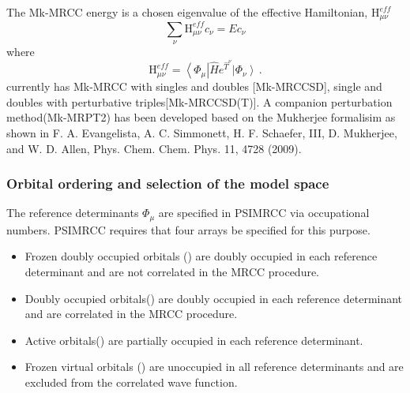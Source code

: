 The Mk-MRCC energy is a chosen eigenvalue of the effective Hamiltonian, $\textrm{H}^{eff}_{\mu \nu}$
 \begin{equation*}
\sum_\nu \textrm{H}^{eff}_{\mu \nu} c_\nu =E c_\nu
 \end{equation*}
where 
\begin{equation*}
\textrm{H}^{eff}_{\mu \nu} = \left \langle \Phi_\mu \right | \hat{H}e^{\hat{T}^\nu} \left | \Phi_\nu \right \rangle \, \textrm{.}
\end{equation*}
 \PSIfour currently has Mk-MRCC with singles and doubles [Mk-MRCCSD], single and doubles with perturbative triples[Mk-MRCCSD(T)]. A companion perturbation method(Mk-MRPT2) has been developed based on the Mukherjee formalisim as shown in F. A. Evangelista, A. C. Simmonett, H. F. Schaefer, III, D. Mukherjee, and W. D. Allen, Phys. Chem. Chem. Phys. 11, 4728 (2009). 
\\
\subsubsection{Orbital ordering and selection of the model space}
The reference determinants $\Phi_\mu$ are specified in PSIMRCC via occupational numbers. PSIMRCC requires that four arrays be specified for this purpose.

\begin{itemize}
\item Frozen doubly occupied orbitals () are doubly occupied in each reference determinant and are not correlated in the MRCC procedure.
\item Doubly occupied orbitals() are doubly occupied in each reference determinant and are correlated in the MRCC procedure.
\item Active orbitals() are partially occupied in each reference determinant.
\item Frozen virtual orbitals () are unoccupied in all reference determinants and are excluded from the correlated wave function.
\end{itemize} 


